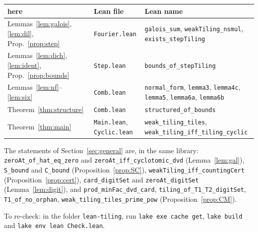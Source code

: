 \documentclass[11pt,a4paper]{amsart}
\theoremstyle{definition}
\theoremstyle{remark}
\newcommand{\lean}[1]{\texttt{#1}}
\begin{document}
\medskip
\begin{center}\small
\begin{tabular}{p{}p{}p{}}
\hline
here & Lean file & Lean name\\
\hline
Lemmas~\ref{lem:galois}, \ref{lem:dil}, Prop.~\ref{prop:step} & \lean{Fourier.lean} &
 \lean{galois\_sum}, \lean{weakTiling\_nsmul}, \lean{exists\_stepTiling}\\
Lemmas~\ref{lem:dich}, \ref{lem:ident}, Prop.~\ref{prop:bounds} & \lean{Step.lean} & \lean{bounds\_of\_stepTiling}\\
Lemmas~\ref{lem:nf}--\ref{lem:six} & \lean{Comb.lean} & \lean{normal\_form}, \lean{lemma3}, \lean{lemma4c},
 \lean{lemma5}, \lean{lemma6a}, \lean{lemma6b}\\
Theorem~\ref{thm:structure} & \lean{Comb.lean} & \lean{structured\_of\_bounds}\\
Theorem~\ref{thm:main} & \lean{Main.lean}, \lean{Cyclic.lean} & \lean{weak\_tiling\_tiles},
 \lean{weak\_tiling\_iff\_tiling\_cyclic}\\
\hline
\end{tabular}
\end{center}
\medskip

{\sloppy\noindent The statements of Section~\ref{sec:general} are, in the same library: \lean{zeroAt\_of\_hat\_eq\_zero} and
\lean{zeroAt\_iff\_cyclotomic\_dvd} (Lemma~\ref{lem:gal}), \lean{S\_bound} and \lean{C\_bound}
(Proposition~\ref{prop:SC}), \lean{weakTiling\_iff\_countingCert} (Proposition~\ref{prop:cert}),
\lean{card\_digitSet} and \lean{zeroAt\_digitSet} (Lemma~\ref{lem:digit}), and \lean{prod\_minFac\_dvd\_card},
\lean{tiling\_of\_T1\_T2\_digitSet}, \lean{T1\_of\_no\_orphan}, \lean{weak\_tiling\_tiles\_prime\_pow}
(Proposition~\ref{prop:CM}).\par}

\medskip
\noindent To re-check: in the folder \texttt{lean-tiling}, run \texttt{lake exe cache get}, \texttt{lake build}
and \texttt{lake env lean Check.lean}.
\end{document}
